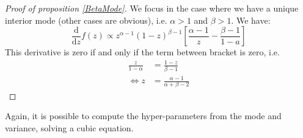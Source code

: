 \documentclass{amsart}
\theoremstyle{plain}
\theoremstyle{remark}
\numberwithin{equation}{section}
\begin{document}
\begin{proof}[Proof of proposition \ref{BetaMode}]
  We focus in the case where we have a unique interior mode (other cases are obvious), i.e. $\alpha>1$ and $\beta>1$. We have:
  \[
    \frac{\mathrm d}{\mathrm dz} f(z) \propto z^{\alpha-1}(1-z)^{\beta-1}\left[\frac{\alpha-1}{z}-\frac{\beta-1}{1-a}\right]
  \]
  This derivative is zero if and only if the term between bracket is zero, i.e.
  \[
    \begin{split}
      \frac{z}{1-\alpha} &= \frac{1-z}{\beta-1} \\
      \Leftrightarrow z &= \frac{\alpha-1}{\alpha+\beta-2}
    \end{split}
  \]
\end{proof}

Again, it is possible to compute the hyper-parameters from the mode and variance, solving a cubic equation.
\end{document}
